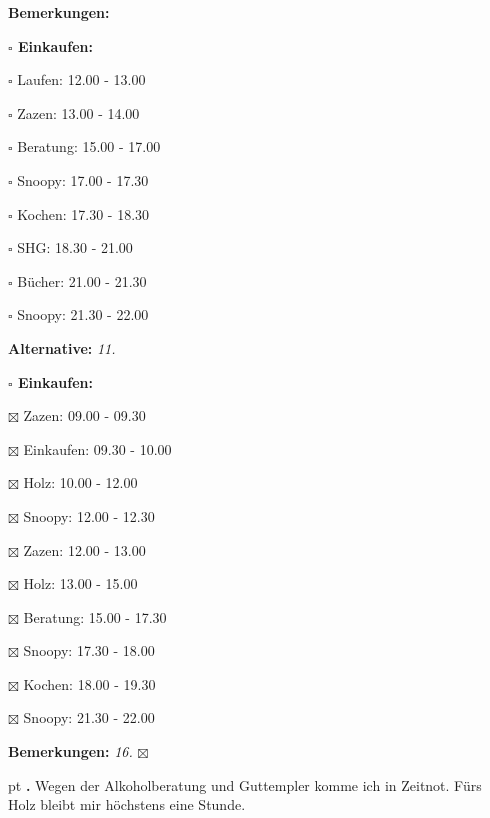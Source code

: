 \documentclass[10pt,a4paper]{article}
\newcounter{notec}
\newcommand\notep[1]{%
  \stepcounter{notec}
  \vskip #1pt
  {\bf\arabic{notec}.}
}
\newcommand\prop[1] {{\color {alizarin} {\bf #1}}}             %
\newcommand\mand[1] {{\color {burntorange} {\bf #1}}}          %
\newcommand\topspace{\vskip -15pt \hskip 20pt}
\newcommand\bottomspace{\vskip 4pt}
\newcommand\n[1] { {\sl #1.} \hskip 5pt }
\begin{document}
\begin{mdframed}[style=daystyle]
\begin{labeling}{{\mand {Bemerkungen:}}}
\begin{minipage}{0.75\textwidth}
\begin{labeling}{\prop {$\square$ {Einkaufen:}}}
      \item[$\square$ Laufen:]    12.00 - 13.00
      \item[$\square$ Zazen:]     13.00 - 14.00
      \item[$\square$ Beratung:]  15.00 - 17.00
        
      \item[$\square$ Snoopy:]    17.00 - 17.30
      \item[$\square$ Kochen:]    17.30 - 18.30
      \item[$\square$ SHG:]       18.30 - 21.00
      \item[$\square$ Bücher:]    21.00 - 21.30
        
      \item[$\square$ Snoopy:]    21.30 - 22.00
      \end{labeling}
    \end{minipage}
    \bottomspace
  \item[{\mand {Alternative:}}]    \n{11}
    \topspace
    \begin{minipage}{0.75\textwidth}  
      \begin{labeling}{\prop {$\square$ {Einkaufen:}}} 
        \setlength\itemsep{-3pt}
      \item[$\boxtimes$ Zazen:]     09.00 - 09.30
      \item[$\boxtimes$ Einkaufen:] 09.30 - 10.00
      \item[$\boxtimes$ Holz:]      10.00 - 12.00
      \item[$\boxtimes$ Snoopy:]    12.00 - 12.30
      \item[$\boxtimes$ Zazen:]     12.00 - 13.00
      \item[$\boxtimes$ Holz:]      13.00 - 15.00
      \item[$\boxtimes$ Beratung:]  15.00 - 17.30
      \item[$\boxtimes$ Snoopy:]    17.30 - 18.00
      \item[$\boxtimes$ Kochen:]    18.00 - 19.30
      \item[$\boxtimes$ Snoopy:]    21.30 - 22.00
      \end{labeling}
    \end{minipage}
    \bottomspace
  \item[{\mand {Bemerkungen:}}]    \n{16} $\boxtimes$
  \end{labeling}
    
  \setcounter{notec}{0}
  
  \notep 0 Wegen der Alkoholberatung und Guttempler komme ich in Zeitnot. Fürs
  Holz bleibt mir höchstens eine Stunde.


\end{mdframed}
\end{document}
